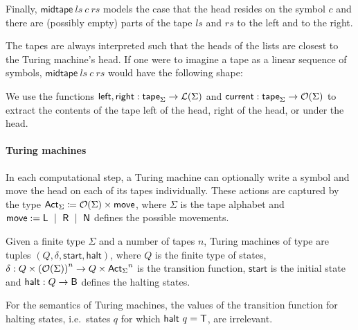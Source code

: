 Finally, $\textsf{midtape}~ls~c~rs$ models the case that the head resides on the symbol $c$ and there are (possibly empty) parts of the tape $ls$ and $rs$ to the left and to the right.

The tapes are always interpreted such that the heads of the lists are closest to the Turing machine's head. If one were to imagine a tape as a linear sequence of symbols, $\textsf{midtape}~ls~c~rs$ would have the following shape: 
\begin{center}
\end{center}

We use the functions $\textsf{left}, \textsf{right} : \textsf{tape}_\Sigma \rightarrow \mathcal{L} (\Sigma)$ and $\textsf{current} : \textsf{tape}_\Sigma \rightarrow \mathcal{O}{(\Sigma)}$ to extract the contents of the tape left of the head, right of the head, or under the head. 

\paragraph{Turing machines}
In each computational step, a Turing machine can optionally write a symbol and move the head on each of its tapes individually. These actions are captured by the type  $\textsf{Act}_{\Sigma} \coloneqq{} \mathcal{O}{(\Sigma)} \times \textsf{move}$, where $\Sigma$ is the tape alphabet and 
$\textsf{move} := \textsf{L} ~\mid~ \textsf{R} ~\mid~ \textsf{N}$
defines the possible movements. 

\begin{definition}
  Given a finite type $\Sigma$ and a number of tapes $n$, Turing machines of type  are tuples $(Q, \delta, \textsf{start}, \textsf{halt})$, where $Q$ is the finite type of states, $\delta : Q \times {(\mathcal{O}{(\Sigma)})}^n \rightarrow Q \times {\textsf{Act}_\Sigma}^n$ is the transition function, $\textsf{start}$ is the initial state and $\textsf{halt} : Q \rightarrow \textsf{B}$ defines the halting states.
\end{definition}
For the semantics of Turing machines, the values of the transition function for halting states, i.e.\ states $q$ for which $\textsf{halt}~q = \mathsf{T}$, are irrelevant. 

